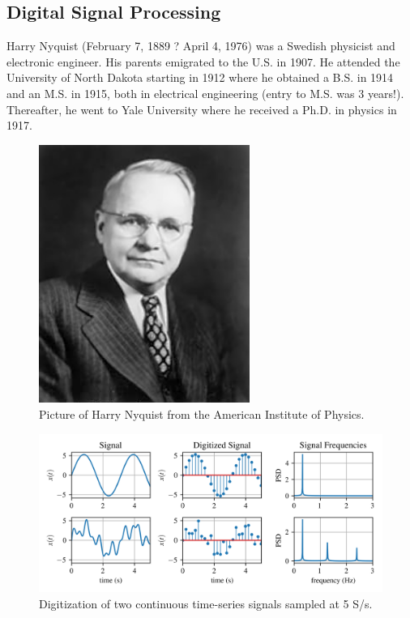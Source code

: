 \documentclass[12pt,letter]{article}
\begin{document}
\subsection{Digital Signal Processing}


	\begin{review}
	\label{sec:Harry_Nyquist}
		
		Harry Nyquist (February 7, 1889 ? April 4, 1976) was a Swedish physicist and electronic engineer. His parents emigrated to the U.S. in 1907.  He attended the University of North Dakota starting in 1912 where he obtained a B.S. in 1914 and an M.S. in 1915, both in electrical engineering (entry to M.S. was 3 years!). Thereafter, he went to Yale University where he received a Ph.D. in physics in 1917.

		\begin{figure}[H]
			\centering
			\includegraphics[width=2.71in]{../figures/Harry_Nyquist.jpg}
			\caption{Picture of Harry Nyquist from the American Institute of Physics.\protect\footnotemark[1]}
			\label{fig:Harry_Nyquist}
		\end{figure}
	\end{review}



\begin{figure}[H]
    \centering
    \includegraphics[width=6.5in]{../figures/signal_digitization.png}
    \caption{Digitization of two continuous time-series signals sampled at 5 S/s.}
    \label{fig:signal_digitization}
\end{figure}
\end{document}
